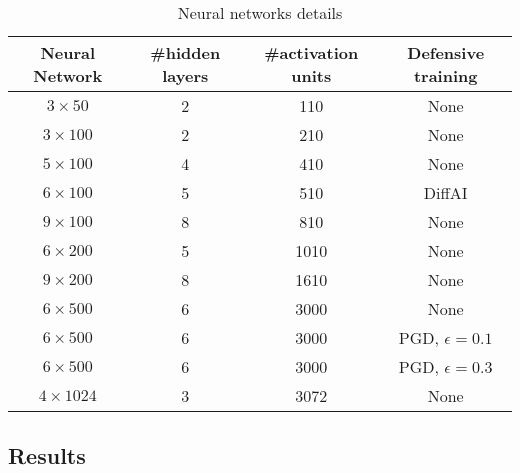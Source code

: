 \begin{table}
    \centering
    \begin{tabular}{c|c|c|c}
        \hline
        \textbf{Neural Network} & \textbf{\#hidden layers} & \textbf{\#activation units} & \textbf{Defensive training} \\
        \hline
        $3\times 50$ & 2 & 110 & None \\
        $3\times 100$ & 2 & 210 & None  \\
        $5\times 100$ & 4 & 410 & None  \\
        $6\times 100$ & 5 & 510 & DiffAI \\
        $9\times 100$ & 8 & 810 & None  \\
        $6\times 200$ & 5 & 1010 & None  \\
        $9\times 200$ & 8 & 1610 & None  \\
        $6\times 500$ & 6 & 3000 & None  \\
        $6\times 500$ & 6 & 3000 & PGD, $\epsilon = 0.1$ \\
        $6\times 500$ & 6 & 3000 & PGD, $\epsilon = 0.3$ \\
        $4\times 1024$ & 3 & 3072 & None  \\
        \hline
    \end{tabular}
    \caption{Neural networks details}
    \label{tb:nndetail}
\end{table}

\subsection{Results}

